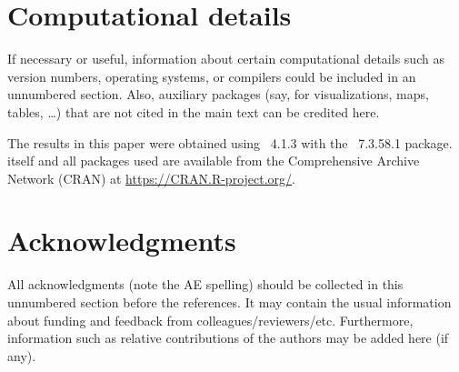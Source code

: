 \documentclass[article]{jss}\usepackage[]{graphicx}\usepackage[]{xcolor}
\begin{document}

\section*{Computational details}

\begin{leftbar}
If necessary or useful, information about certain computational details
such as version numbers, operating systems, or compilers could be included
in an unnumbered section. Also, auxiliary packages (say, for visualizations,
maps, tables, \dots) that are not cited in the main text can be credited here.
\end{leftbar}

The results in this paper were obtained using
~4.1.3 with the
~7.3.58.1 package.  itself
and all packages used are available from the Comprehensive
 Archive Network (CRAN) at
\url{https://CRAN.R-project.org/}.


\section*{Acknowledgments}

\begin{leftbar}
All acknowledgments (note the AE spelling) should be collected in this
unnumbered section before the references. It may contain the usual information
about funding and feedback from colleagues/reviewers/etc. Furthermore,
information such as relative contributions of the authors may be added here
(if any).
\end{leftbar}







\newpage
\end{document}
